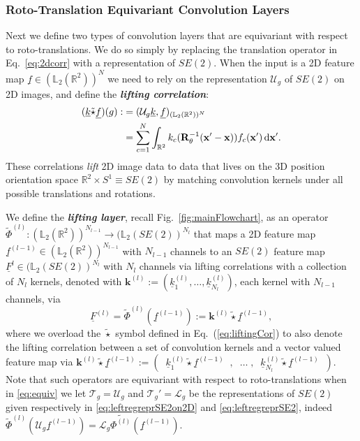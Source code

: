 \documentclass[twocolumn,final]{article}
\begin{document}
\subsubsection{Roto-Translation Equivariant Convolution Layers}
Next we define two types of convolution layers that are equivariant with respect to roto-translations. We do so simply by replacing the translation operator in Eq.~\eqref{eq:2dcorr} with a representation of $SE(2)$. When the input is a 2D feature map $\underline{f} \in (\mathbb{L}_2(\mathbb{R}^2))^{N}$ we need to rely on the representation $\mathcal{U}_g$ of $SE(2)$ on 2D images, and define the \textbf{\emph{lifting correlation}}:
\begin{align}
(\underline{k}\tilde{\star} \underline{f})(g) 
:&= ( \mathcal{U}_g  \underline{k}, \underline{f} )_{(\mathbb{L}_2(\mathbb{R}^2))^{N}} \label{eq:liftingCor} \\
&= \sum_{c=1}^{N}\int_{\mathbb{R}^2} k_c(\mathbf{R}_\theta^{-1} (\mathbf{x}' - \mathbf{x})) f_c(\mathbf{x}') \, {\rm d}\mathbf{x}'. \nonumber
\end{align}
These correlations \emph{lift} 2D image data to data that lives on the 3D position orientation space $\mathbb{R}^2\times S^1 \equiv SE(2)$ by matching convolution kernels under all possible translations and rotations. 

We define the \textbf{\emph{lifting layer}}, recall Fig.~\ref{fig:mainFlowchart}, as an operator {$\tilde{\Phi}^{(l)}:(\mathbb{L}_2(\mathbb{R}^2))^{N_{l-1}}\rightarrow (\mathbb{L}_2(SE(2))^{N_{l}}$} that maps a 2D feature map $\underline{f}^{(l-1)} \in (\mathbb{L}_2(\mathbb{R}^2))^{N_{l-1}}$ with $N_{l-1}$ channels to an $SE(2)$ feature map $\underline{F}^{l} \in (\mathbb{L}_2(SE(2))^{N_{l}}$ with $N_l$ channels via lifting correlations with a collection of $N_l$ kernels, denoted with $\mathbf{k}^{(l)} := (\underline{k}_1^{(l)},\dots,\underline{k}_{N_l}^{(l)})$, each kernel with $N_{l-1}$ channels, via
\begin{equation}
\underline{F}^{(l)} = \tilde{\Phi}^{(l)}(\underline{f}^{(l-1)}) := \mathbf{k}^{(l)} \tilde{\star} \underline{f}^{(l-1)}, \label{eq:liftingLayer}
\end{equation}
where we overload the $\tilde{\star}$ symbol defined in Eq.~(\ref{eq:liftingCor}) to also denote the lifting correlation between a set of convolution kernels and a vector valued feature map via $\mathbf{k}^{(l)} \tilde{\star} \underline{f}^{(l-1)} := 
\left( \;\;
\underline{k}_{1}^{(l)} \tilde{\star} \underline{f}^{(l-1)} \;\; ,
\;\;\dots\; , \;\;
\underline{k}_{N_{l}}^{(l)} \tilde{\star} \underline{f}^{(l-1)} 
\;\;\right)$. Note that such operators are equivariant with respect to roto-translations when in \eqref{eq:equiv} we let $\mathcal{T}_g = \mathcal{U}_g$ and $\mathcal{T}_g' = \mathcal{L}_g$ be the representations of $SE(2)$ given respectively in \eqref{eq:leftregreprSE2on2D} and \eqref{eq:leftregreprSE2}, indeed $\tilde{\Phi}^{(l)}(\mathcal{U}_g \underline{f}^{(l-1)}) = \mathcal{L}_g \tilde{\Phi^{(l)}}(\underline{f}^{(l-1)})$.
\end{document}
